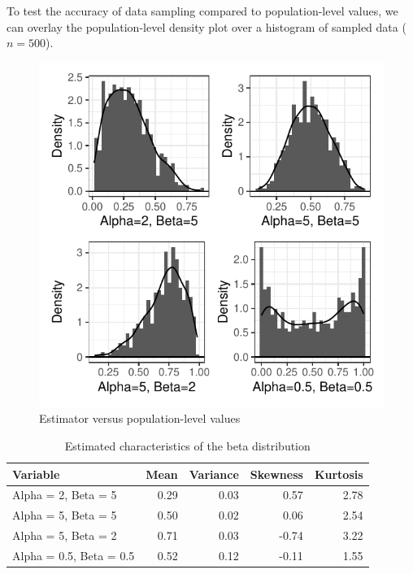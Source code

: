 \documentclass{article}\usepackage[]{graphicx}\usepackage[]{xcolor}
\begin{document}
\begin{multicols}{2}
To test the accuracy of data sampling compared to population-level values, we can overlay the population-level density plot over a histogram of sampled data ($n=500$).

\begin{figure}[H]
 \begin{center}
 \includegraphics[scale=0.75]{density_histogram.pdf}
 \caption{Estimator versus population-level values}
 \label{fig2}
 \end{center}
 \end{figure}





\begin{table}[H]
\centering
\begingroup\small
\begin{tabular}{lrrrr}
  \hline
Variable & Mean & Variance & Skewness & Kurtosis \\ 
  \hline
Alpha = 2, Beta = 5 & 0.29 & 0.03 & 0.57 & 2.78 \\ 
  Alpha = 5, Beta = 5 & 0.50 & 0.02 & 0.06 & 2.54 \\ 
  Alpha = 5, Beta = 2 & 0.71 & 0.03 & -0.74 & 3.22 \\ 
  Alpha = 0.5, Beta = 0.5 & 0.52 & 0.12 & -0.11 & 1.55 \\ 
   \hline
\end{tabular}
\endgroup
\caption{Estimated characteristics of the beta distribution} 
\label{estim.tab}
\end{table}



\end{multicols}
\end{document}
